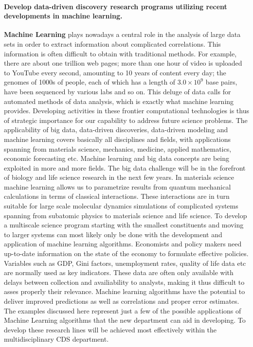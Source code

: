 \documentclass[%
oneside,                 %
final,                   %
10pt]{article}
\begin{document}
\paragraph{Develop data-driven discovery research programs utilizing recent developments in machine learning.}
 \textbf{Machine Learning} plays nowadays a central role in the analysis of
large data sets in order to extract information about complicated
correlations. This information is often difficult to obtain with
traditional methods. For example, there are about one trillion web
pages; more than one hour of video is uploaded to YouTube every
second, amounting to 10 years of content every day; the genomes of
1000s of people, each of which has a length of $3.0\times 10^9$ base
pairs, have been sequenced by various labs and so on. This deluge of
data calls for automated methods of data analysis, which is exactly
what machine learning provides.  Developing activities in these
frontier computational technologies is thus of strategic importance
for our capability to address future science problems. The
applicability of big data, data-driven discoveries, data-driven
modeling and machine learning covers basically all disciplines and
fields, with applications spanning from materials science, mechanics,
medicine, applied mathematics, economic forecasting etc. Machine
learning and big data concepts are being exploited in more and more
fields.  The big data challenge will be in the forefront of biology
and life science research in the next few years.  In materials science
machine learning allows us to parametrize results from quantum
mechanical calculations in terms of classical interactions. These
interactions are in turn suitable for large scale molecular dynamics
simulations of complicated systems spanning from subatomic physics to
materials science and life science.  To develop a multiscale science
program starting with the smallest constituents and moving to larger
systems can most likely only be done with the development and
application of machine learning algorithms.  Economists and policy
makers need up-to-date information on the state of the economy to
formulate effective policies. Variables such as GDP, Gini factors,
unemployment rates, quality of life data etc are normally used as key
indicators. These data are often only available with delays between
collection and availiability to analysts, making it thus difficult to
asses properly their relevance. Machine learning algorithms have the
potential to deliver improved predictions as well as correlations and
proper error estimates. The examples discussed here represent just a
few of the possible applications of Machine Learning algorithms that
the new department can aid in developing. To develop these research
lines will be achieved most effectively within the multidisciplinary
CDS department.
\end{document}
